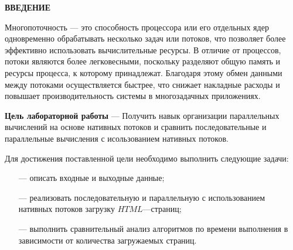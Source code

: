 \begin{center}
    \textbf{ВВЕДЕНИЕ}
\end{center}

Многопоточность — это способность процессора или его отдельных ядер одновременно обрабатывать несколько задач или потоков, что позволяет более эффективно использовать вычислительные ресурсы. В отличие от процессов, потоки являются более легковесными, поскольку разделяют общую память и ресурсы процесса, к которому принадлежат. Благодаря этому обмен данными между потоками осуществляется быстрее, что снижает накладные расходы и повышает производительность системы в многозадачных приложениях\cite{threads}.

\textbf{Цель лабораторной работы} --- Получить навык организации параллельных вычислений на основе нативных потоков и сравнить последовательные и параллельные вычисления с исользованием нативных потоков.

Для достижения поставленной цели необходимо выполнить следующие задачи:
\begin{itemize}
    \item[---] описать входные и выходные данные;
    \item[---] реализовать последовательную и параллельную с использованием нативных потоков загрузку  $HTML$---страниц;
    \item[---] выполнить сравнительный анализ алгоритмов по времени выполнения в зависимости от количества загружаемых страниц.
\end{itemize}